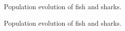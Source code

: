\documentclass[aps,prl,preprint,superscriptaddress]{revtex4}
\begin{document}
\begin{figure}[H]
	\centering
	\caption{Population evolution of fish and sharks.}
	\label{more_clusters} 
\end{figure}


\begin{figure}[H]
	\centering
	\caption{Population evolution of fish and sharks.}
	\label{more_clusters} 
\end{figure}
\end{document}
